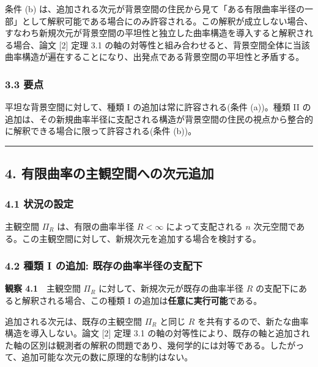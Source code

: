 \documentclass[a4paper,11pt]{ltjsarticle}
\theoremstyle{definition}
\begin{document}
条件 (b) は、追加される次元が背景空間の住民から見て「ある有限曲率半径の一部」として解釈可能である場合にのみ許容される。この解釈が成立しない場合、すなわち新規次元が背景空間の平坦性と独立した曲率構造を導入すると解釈される場合、論文 {[}2{]} 定理 3.1 の軸の対等性と組み合わせると、背景空間全体に当該曲率構造が遍在することになり、出発点である背景空間の平坦性と矛盾する。

\subsubsection{3.3 要点}\label{ux8981ux70b9}

平坦な背景空間に対して、種類 I の追加は常に許容される(条件 (a))。種類 II の追加は、その新規曲率半径に支配される構造が背景空間の住民の視点から整合的に解釈できる場合に限って許容される(条件 (b))。

\begin{center}\rule{0.5\linewidth}{0.5pt}\end{center}

\subsection{4. 有限曲率の主観空間への次元追加}\label{ux6709ux9650ux66f2ux7387ux306eux4e3bux89b3ux7a7aux9593ux3078ux306eux6b21ux5143ux8ffdux52a0}

\subsubsection{4.1 状況の設定}\label{ux72b6ux6cc1ux306eux8a2dux5b9a-1}

主観空間 \(\Pi_R\) は、有限の曲率半径 \(R < \infty\) によって支配される \(n\) 次元空間である。この主観空間に対して、新規次元を追加する場合を検討する。

\subsubsection{4.2 種類 I の追加: 既存の曲率半径の支配下}\label{ux7a2eux985e-i-ux306eux8ffdux52a0-ux65e2ux5b58ux306eux66f2ux7387ux534aux5f84ux306eux652fux914dux4e0b}

\textbf{観察 4.1}　主観空間 \(\Pi_R\) に対して、新規次元が既存の曲率半径 \(R\) の支配下にあると解釈される場合、この種類 I の追加は\textbf{任意に実行可能}である。

追加される次元は、既存の主観空間 \(\Pi_R\) と同じ \(R\) を共有するので、新たな曲率構造を導入しない。論文 {[}2{]} 定理 3.1 の軸の対等性により、既存の軸と追加された軸の区別は観測者の解釈の問題であり、幾何学的には対等である。したがって、追加可能な次元の数に原理的な制約はない。
\end{document}
